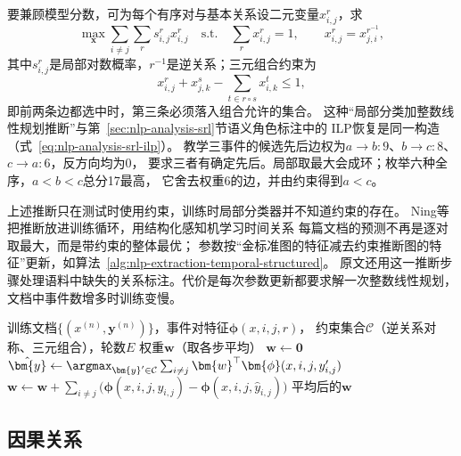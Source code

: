 要兼顾模型分数，可为每个有序对与基本关系设二元变量$x_{i,j}^{r}$，求
\[
  \max_{\bm{x}}\sum_{i\ne j}\sum_r s_{i,j}^{r}x_{i,j}^{r}
  \quad\text{s.t.}\quad
  \sum_r x_{i,j}^{r}=1,\qquad x_{i,j}^{r}=x_{j,i}^{r^{-1}},
\]
其中$s_{i,j}^{r}$是局部对数概率，$r^{-1}$是逆关系；三元组合约束为
\begin{equation}
  x_{i,j}^{r}+x_{j,k}^{s}
  -\sum_{t\in r\circ s}x_{i,k}^{t}\leq1,
  \label{eq:nlp-extraction-temporal-ilp}
\end{equation}
即前两条边都选中时，第三条必须落入组合允许的集合。
这种“局部分类加整数线性规划推断”与第~\ref{sec:nlp-analysis-srl}节语义角色标注中的
ILP恢复是同一构造（式~\eqref{eq:nlp-analysis-srl-ilp}）。
教学三事件的候选先后边权为$a\to b:9$、$b\to c:8$、$c\to a:6$，反方向均为0，
要求三者有确定先后。局部取最大会成环；枚举六种全序，$a<b<c$总分17最高，
它舍去权重6的边，并由约束得到$a<c$。

上述推断只在测试时使用约束，训练时局部分类器并不知道约束的存在。
Ning等把推断放进训练循环，用结构化感知机学习时间关系
每篇文档的预测不再是逐对取最大，而是带约束的整体最优；
参数按“金标准图的特征减去约束推断图的特征”更新，如算法~\ref{alg:nlp-extraction-temporal-structured}。
原文还用这一推断步骤处理语料中缺失的关系标注。代价是每次参数更新都要求解一次整数线性规划，
文档中事件数增多时训练变慢。

\begin{algorithm}[带全局约束推断的时间关系结构化学习]
  \label{alg:nlp-extraction-temporal-structured}
  \begin{algorithmic}[1]
    \Require 训练文档$\{(x^{(n)},\bm{y}^{(n)})\}$，事件对特征$\bm{\phi}(x,i,j,r)$，
      约束集合$\mathcal{C}$（逆关系对称、三元组合），轮数$E$
    \Ensure 权重$\bm{w}$（取各步平均）
    \State $\bm{w}\gets\bm{0}$
        \State $\hat{\bm{y}}\gets\argmax_{\bm{y}'\in\mathcal{C}}
          \sum_{i\ne j}\bm{w}^{\top}\bm{\phi}(x,i,j,y'_{i,j})$
          \State $\bm{w}\gets\bm{w}+\sum_{i\ne j}\bigl(\bm{\phi}(x,i,j,y_{i,j})-\bm{\phi}(x,i,j,\hat{y}_{i,j})\bigr)$
        \EndIf
      \EndFor
    \EndFor
    \State \Return 平均后的$\bm{w}$
  \end{algorithmic}
\end{algorithm}

\subsection{因果关系}
\label{sec:nlp-extraction-causal}

